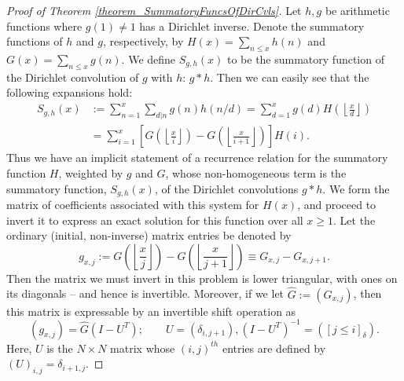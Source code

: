 \documentclass[11pt,reqno,a4letter]{article}
\numberwithin{figure}{section}
\numberwithin{table}{section}
\newcommand{\Iverson}[1]{\ensuremath{\left[#1\right]_{\delta}}}
\newcommand{\floor}[1]{\left\lfloor #1 \right\rfloor}
\theoremstyle{plain}
\numberwithin{theorem}{section}
\theoremstyle{definition}
\begin{document}
\begin{proof}[Proof of Theorem \ref{theorem_SummatoryFuncsOfDirCvls}]
Let $h,g$ be arithmetic functions where $g(1) \neq 1$ has a Dirichlet inverse. Denote the summatory functions of $h$ and $g$, 
respectively, by $H(x) = \sum_{n \leq x} h(n)$ and $G(x) = \sum_{n \leq x} g(n)$. 
We define $S_{g,h}(x)$ to be the summatory function of the Dirichlet convolution of $g$ with $h$: $g \ast h$. 
Then we can easily see that the following expansions hold: 
\begin{align*} 
S_{g,h}(x) & := \sum_{n=1}^{x} \sum_{d|n} g(n) h(n/d) = \sum_{d=1}^x g(d) H\left(\floor{\frac{x}{d}}\right) \\ 
     & = \sum_{i=1}^x \left[G\left(\floor{\frac{x}{i}}\right) - G\left(\floor{\frac{x}{i+1}}\right)\right] H(i). 
\end{align*} 
Thus we have an implicit statement of a recurrence relation for the summatory function $H$, weighted by $g$ and $G$, 
whose non-homogeneous term is the summatory function, $S_{g,h}(x)$, of the Dirichlet convolutions $g \ast h$. 
We form the matrix of coefficients associated with this system for $H(x)$, and proceed to invert it to express an 
exact solution for this function over all $x \geq 1$. Let the ordinary (initial, non-inverse) matrix entries be denoted by 
\[
g_{x,j} := G\left(\floor{\frac{x}{j}}\right) - G\left(\floor{\frac{x}{j+1}}\right) \equiv G_{x,j} - G_{x,j+1}. 
\]
Then the matrix we must invert in this problem is lower triangular, with ones on its diagonals -- and hence is invertible. 
Moreover, if we let $\hat{G} := (G_{x,j})$, then this matrix is 
expressable by an invertible shift operation as 
\[
(g_{x,j}) = \hat{G} (I - U^{T}); \qquad U = (\delta_{i,j+1}), (I - U^T)^{-1} = (\Iverson{j \leq i}). 
\]
Here, $U$ is the $N \times N$ matrix whose $(i,j)^{th}$ entries are defined by 
$(U)_{i,j} = \delta_{i+1,j}$. 


\end{proof}
\end{document}
